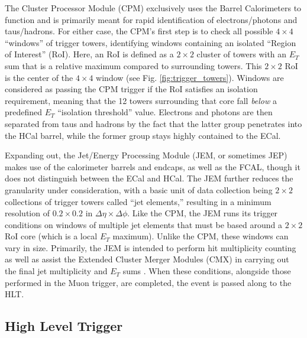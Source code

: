         The Cluster Processor Module (CPM) exclusively uses the Barrel Calorimeters to function
            and is primarily meant for rapid identification of electrons/photons and taus/hadrons.
        For either case, the CPM's first step is to check all possible $4 \times 4$ ``windows'' of trigger towers, identifying windows containing an isolated ``Region of Interest'' (RoI).
        Here, an RoI is defined as a $2 \times 2$ cluster of towers with an $E_T$ sum that is a relative maximum compared to surrounding towers.
        This $2 \times 2$ RoI is the center of the $4 \times 4$ window (see Fig. \ref{fig:trigger_towers}).
        Windows are considered as passing the CPM trigger if the RoI satisfies an isolation requirement, meaning that the 12 towers surrounding that core fall \textit{below} a predefined $E_T$ ``isolation threshold'' value.
        Electrons and photons are then separated from taus and hadrons by the fact that the latter group penetrates into the HCal barrel, while the former group stays highly contained to the ECal.

        Expanding out, the Jet/Energy Processing Module (JEM, or sometimes JEP) makes use of the calorimeter barrels and endcaps, as well as the FCAL, though it does not distinguish between the ECal and HCal.
        The JEM further reduces the granularity under consideration, with a basic unit of data collection being $2 \times 2$ collections of trigger towers called ``jet elements,'' resulting in a minimum resolution of $0.2 \times 0.2$ in $\Delta \eta \times \Delta \phi$.
        Like the CPM, the JEM runs its trigger conditions on windows of multiple jet elements that must be based around a $2 \times 2$ RoI core (which is a local $E_T$ maximum).
        Unlike the CPM, these windows can vary in size.
        Primarily, the JEM is intended to perform hit multiplicity counting
            as well as assist the Extended Cluster Merger Modules (CMX) in carrying out the final jet multiplicity
            and $E_T$ sums \cite{L1_calo_run1}\cite{trigger_run2}.
        When these conditions, alongside those performed in the Muon trigger, are completed, the event is passed along to the HLT.


\FloatBarrier
    \subsection{High Level Trigger}

